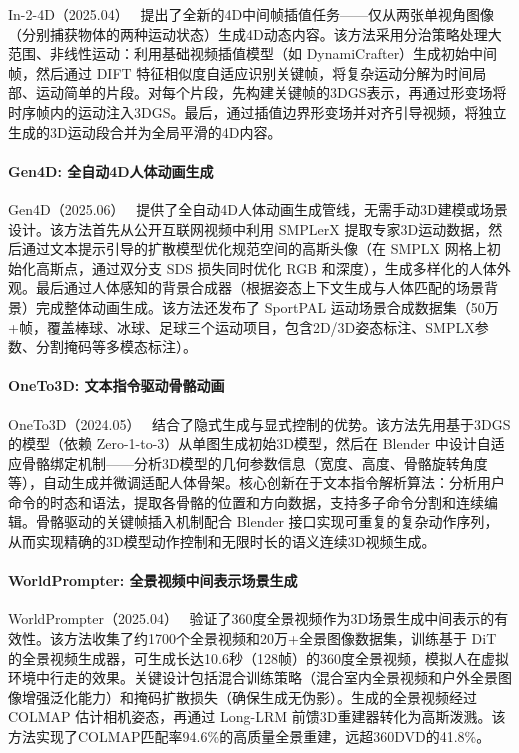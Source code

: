 In-2-4D（2025.04）~\cite{2504_08366} 提出了全新的4D中间帧插值任务——仅从两张单视角图像（分别捕获物体的两种运动状态）生成4D动态内容。该方法采用分治策略处理大范围、非线性运动：利用基础视频插值模型（如 DynamiCrafter）生成初始中间帧，然后通过 DIFT 特征相似度自适应识别关键帧，将复杂运动分解为时间局部、运动简单的片段。对每个片段，先构建关键帧的3DGS表示，再通过形变场将时序帧内的运动注入3DGS。最后，通过插值边界形变场并对齐引导视频，将独立生成的3D运动段合并为全局平滑的4D内容。

\paragraph{Gen4D: 全自动4D人体动画生成}

Gen4D（2025.06）~\cite{2506_05397} 提供了全自动4D人体动画生成管线，无需手动3D建模或场景设计。该方法首先从公开互联网视频中利用 SMPLerX 提取专家3D运动数据，然后通过文本提示引导的扩散模型优化规范空间的高斯头像（在 SMPLX 网格上初始化高斯点，通过双分支 SDS 损失同时优化 RGB 和深度），生成多样化的人体外观。最后通过人体感知的背景合成器（根据姿态上下文生成与人体匹配的场景背景）完成整体动画生成。该方法还发布了 SportPAL 运动场景合成数据集（50万+帧，覆盖棒球、冰球、足球三个运动项目，包含2D/3D姿态标注、SMPLX参数、分割掩码等多模态标注）。

\paragraph{OneTo3D: 文本指令驱动骨骼动画}

OneTo3D（2024.05）~\cite{2405_06547} 结合了隐式生成与显式控制的优势。该方法先用基于3DGS的模型（依赖 Zero-1-to-3）从单图生成初始3D模型，然后在 Blender 中设计自适应骨骼绑定机制——分析3D模型的几何参数信息（宽度、高度、骨骼旋转角度等），自动生成并微调适配人体骨架。核心创新在于文本指令解析算法：分析用户命令的时态和语法，提取各骨骼的位置和方向数据，支持多子命令分割和连续编辑。骨骼驱动的关键帧插入机制配合 Blender 接口实现可重复的复杂动作序列，从而实现精确的3D模型动作控制和无限时长的语义连续3D视频生成。

\paragraph{WorldPrompter: 全景视频中间表示场景生成}

WorldPrompter（2025.04）~\cite{2504_02045} 验证了360度全景视频作为3D场景生成中间表示的有效性。该方法收集了约1700个全景视频和20万+全景图像数据集，训练基于 DiT 的全景视频生成器，可生成长达10.6秒（128帧）的360度全景视频，模拟人在虚拟环境中行走的效果。关键设计包括混合训练策略（混合室内全景视频和户外全景图像增强泛化能力）和掩码扩散损失（确保生成无伪影）。生成的全景视频经过 COLMAP 估计相机姿态，再通过 Long-LRM 前馈3D重建器转化为高斯泼溅。该方法实现了COLMAP匹配率94.6\%的高质量全景重建，远超360DVD的41.8\%。

